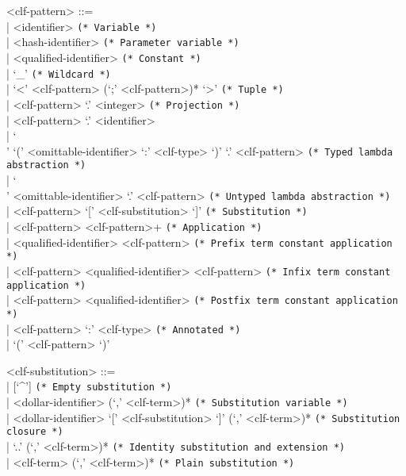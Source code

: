 \documentclass[11pt]{article}
\begin{document}
\begin{grammar}
<clf-pattern> ::= \hfill\\
| <identifier> \hfill \texttt{(* Variable *)}\\
| <hash-identifier> \hfill \texttt{(* Parameter variable *)}\\
| <qualified-identifier> \hfill \texttt{(* Constant *)}\\
| `_' \hfill \texttt{(* Wildcard *)}\\
| `<' <clf-pattern> (`;' <clf-pattern>)* `>' \hfill \texttt{(* Tuple *)}\\
| <clf-pattern> `.' <integer> \hfill \texttt{(* Projection *)}\\
| <clf-pattern> `.' <identifier>\\
| `\\' `(' <omittable-identifier> `:' <clf-type> `)' `.' <clf-pattern> \hfill \texttt{(* Typed lambda abstraction *)}\\
| `\\' <omittable-identifier> `.' <clf-pattern> \hfill \texttt{(* Untyped lambda abstraction *)}\\
| <clf-pattern> `[' <clf-substitution> `]' \hfill \texttt{(* Substitution *)}\\
| <clf-pattern> <clf-pattern>+ \hfill \texttt{(* Application *)}\\
| <qualified-identifier> <clf-pattern> \hfill \texttt{(* Prefix term constant application *)}\\
| <clf-pattern> <qualified-identifier> <clf-pattern> \hfill \texttt{(* Infix term constant application *)}\\
| <clf-pattern> <qualified-identifier> \hfill \texttt{(* Postfix term constant application *)}\\
| <clf-pattern> `:' <clf-type> \hfill \texttt{(* Annotated *)}\\
| `(' <clf-pattern> `)'

<clf-substitution> ::= \hfill\\
| [`^'] \hfill \texttt{(* Empty substitution *)} \\
| <dollar-identifier> (`,' <clf-term>)* \hfill \texttt{(* Substitution variable *)}\\
| <dollar-identifier> `[' <clf-substitution> `]' (`,' <clf-term>)* \hfill \texttt{(* Substitution closure *)}\\
| `..' (`,' <clf-term>)* \hfill \texttt{(* Identity substitution and extension *)}\\
| <clf-term> (`,' <clf-term>)* \hfill \texttt{(* Plain substitution *)}


\end{grammar}
\end{document}
